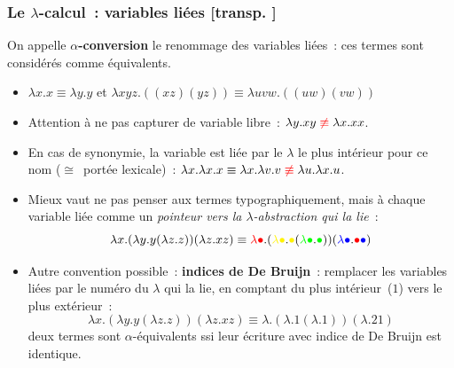 \documentclass[mathserif,a4paper,aspectratio=169]{beamer}
\renewcommand{\frametitle}[1]{\subsubsection*{#1 {\footnotesize[transp. \insertframenumber]}}}
\begin{document}
\begin{frame}
\frametitle{Le $\lambda$-calcul : variables liées}

On appelle \textbf{$\alpha$-conversion} le renommage des variables
liées : ces termes sont considérés comme équivalents.
\begin{itemize}
\item $\lambda x.x \equiv \lambda y.y$ et $\lambda xyz.((xz)(yz))
  \equiv \lambda uvw.((uw)(vw))$
\item Attention à \alert{ne pas capturer} de variable libre : $\lambda
  y.xy \mathrel{\textcolor{red}{\not\equiv}} \lambda x.xx$.
\item En cas de synonymie, la variable est liée par le $\lambda$ le
  \alert{plus intérieur} pour ce nom ($\cong$ portée lexicale) :
  $\lambda x. \lambda x. x \equiv \lambda x. \lambda v. v
  \mathrel{\textcolor{red}{\not\equiv}} \lambda u. \lambda x. u$.
\item Mieux vaut ne pas penser aux termes typographiquement, mais à
  chaque variable liée comme un \emph{pointeur vers la
  $\lambda$-abstraction qui la lie} :
\[
\lambda x. (\lambda y. y (\lambda z. z)) (\lambda z. x z)
\equiv
\textcolor{red}{\lambda\bullet}. (\textcolor{yellow}{\lambda\bullet}. \textcolor{yellow}{\bullet} (\textcolor{green}{\lambda\bullet}. \textcolor{green}{\bullet})) (\textcolor{blue}{\lambda\bullet}. \textcolor{red}{\bullet} \textcolor{blue}{\bullet})
\]
\item Autre convention possible : \textbf{indices de De Bruijn} :
  remplacer les variables liées par le numéro du $\lambda$ qui la lie,
  en comptant du plus intérieur ($1$) vers le plus extérieur :
\[
\lambda x. (\lambda y. y (\lambda z. z)) (\lambda z. x z)
\equiv
\lambda. (\lambda. 1 (\lambda. 1)) (\lambda. 2 1)
\]
deux termes sont $\alpha$-équivalents ssi leur écriture avec indice de
De Bruijn est identique.
\end{itemize}

\end{frame}
%
\end{document}
